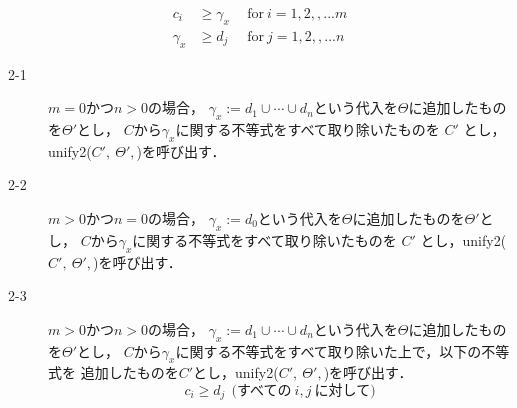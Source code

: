 \begin{oframed}
\begin{description}
\begin{align*}
      c_i & \ge \gamma_x  ~~ & \text{for}~ i=1,2,,...m\\
      \gamma_x & \ge d_j  ~~ & \text{for}~ j=1,2,,...n
    \end{align*}
    \begin{description}
    \item[2-1] $m=0$かつ$n>0$の場合，
      $\gamma_x:=d_1 \cup \cdots \cup d_n$という代入を$\Theta$に追加したものを$\Theta'$とし，
      $C$から$\gamma_x$に関する不等式をすべて取り除いたものを $C'$ とし，unify2($C',~\Theta',$)を呼び出す．
    \item[2-2] $m>0$かつ$n=0$の場合，
      $\gamma_x:=d_0$という代入を$\Theta$に追加したものを$\Theta'$とし，
      $C$から$\gamma_x$に関する不等式をすべて取り除いたものを $C'$ とし，unify2($C',~\Theta',$)を呼び出す．
    \item[2-3] $m>0$かつ$n>0$の場合，
      $\gamma_x:=d_1 \cup \cdots \cup d_n$という代入を$\Theta$に追加したものを$\Theta'$とし，
      $C$から$\gamma_x$に関する不等式をすべて取り除いた上で，以下の不等式を
      追加したものを$C'$とし，unify2($C',~\Theta',$)を呼び出す．
      \[
        c_i \ge d_j   ~~\textrm{(すべての}~i,j~\textrm{に対して)}
      \]
    \end{description}
  \end{description}

\end{oframed}
